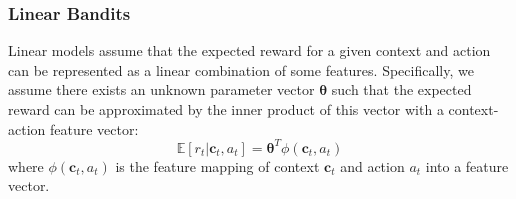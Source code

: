 
\subsubsection{Linear Bandits}
Linear models assume that the expected reward for a given context and action can be represented as a linear combination of some features. Specifically, we assume there exists an unknown parameter vector $\boldsymbol{\theta}$ such that the expected reward can be approximated by the inner product of this vector with a context-action feature vector:
\begin{equation}
    \mathbb{E}[r_t  \vert  \mathbf{c}_t, a_t] = \boldsymbol{\theta}^T \phi(\mathbf{c}_t, a_t)
\end{equation}
where $\phi(\mathbf{c}_t, a_t)$ is the feature mapping of context $\mathbf{c}_t$ and action $a_t$ into a feature vector.

